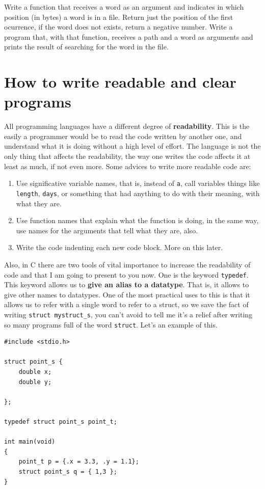 \documentclass[a4paper]{article}
\begin{document}
\begin{exercises}[resume*]
\item Write a function that receives a word as an argument and indicates
in which position (in bytes) a word is in a file. Return just the position of
the first ocurrence, if the word does not exists, return a negative number.
Write a program that, with that function, receives a path and a word as
arguments and prints the result of searching for the word in the file.
\end{exercises}

\section{How to write readable and clear programs}
All programming languages have a different degree of \textbf{readability}. This
is the easily a programmer would be to read the code written by another one, and
understand what it is doing without a high level of effort. The language is not
the only thing that affects the readability, the way one writes the code affects
it at least as much, if not even more. Some advices to write more readable code
are:
\begin{enumerate}
\item Use significative variable names, that is, instead of \verb!a!, call
variables things like \verb!length!, \verb!days!, or something that had anything
to do with their meaning, with what they are.
\item Use function names that explain what the function is doing, in the same
way, use names for the arguments that tell what they are, also.
\item Write the code indenting each new code block. More on this later.
\end{enumerate}

Also, in C there are two tools of vital importance to increase the readability
of code and that I am going to present to you now. One is the keyword
\lstinline[style=C]!typedef!. This keyword allows us to \textbf{give an alias
to a datatype}. That is, it allows to give other names to datatypes. One of the
most practical uses to this is that it allows us to refer with a single word to
refer to a struct, so we save the fact of writing \verb!struct mystruct_s!,
you can't avoid to tell me it's a relief after writing so many programs full of
the word \verb!struct!. Let's an example of this.

\noindent
\begin{minipage}[H]{\linewidth}
\mbox{}
\begin{lstlisting}[style=C,
caption={Definition of a type from a struct},
label={lst:structTypeDefinition}]
#include <stdio.h>

struct point_s {
    double x;
    double y;

};

typedef struct point_s point_t;

int main(void)
{
    point_t p = {.x = 3.3, .y = 1.1};
    struct point_s q = { 1,3 };
}
\end{lstlisting}
\end{minipage}
\end{document}
